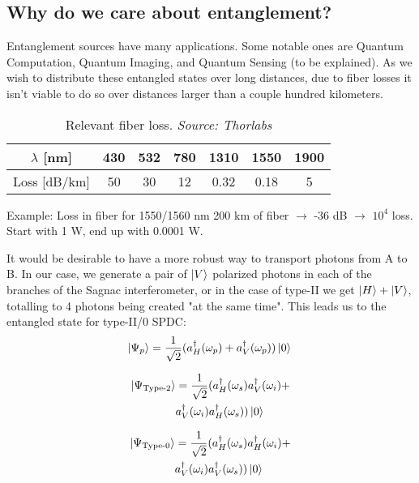 \documentclass{article}
\theoremstyle{mytheoremstyle}
\theoremstyle{mytheoremstyle}
\theoremstyle{myproblemstyle}
\begin{document}
\subsection{Why do we care about entanglement?}
Entanglement sources have many applications. Some notable ones are Quantum Computation, Quantum Imaging,
and Quantum Sensing (to be explained). %
As we wish to distribute these entangled states over long distances, due to fiber losses it isn't viable to do so
over distances larger than a couple hundred kilometers.
\begin{center}
	\begin{table}[h]
		\caption{Relevant fiber loss. \textit{Source: Thorlabs}}
		\label{tab:fiberloss}
		\begin{tabular}{|c|c|c|c|c|c|c|}
			\hline
			$\lambda$ [nm] & 430 & 532 & 780 & 1310 & 1550 & 1900\\
			\hline
			Loss [dB/km] & 50 & 30 & 12 & 0.32 &  0.18 & 5\\
			\hline
		\end{tabular}
	\end{table}
\end{center}
\begin{exampleblock}{Example: Loss in fiber for 1550/1560 nm}
	200 km of fiber $\rightarrow$ -36 dB $\rightarrow$ $10^4$ loss.
	Start with 1 W, end up with 0.0001 W.
\end{exampleblock}
It would be desirable to have a more robust way to transport photons from A to B.
In our case, we generate a pair of $\ket{V}$ polarized photons in each of the branches of the Sagnac interferometer,
or in the case of type-II we get $\ket{H} + \ket{V}$, totalling to 4 photons being created "at the same time".
This leads us to the entangled state for type-II/0 SPDC:
\begin{equation*}
	\ket{\Psi_{p}} = \frac{1}{\sqrt{2}} ( a_{H}^{\dagger} ( \omega_p ) + a_{V}^{\dagger} ( \omega_p ) )\ket{0}\\
\end{equation*}
\begin{minipage}[l]{0.48\textwidth}
	\begin{equation*}
		\begin{aligned}
			\ket{\Psi_{\text{Type-2}}} &= \frac{1}{\sqrt{2}}(a_{H}^{\dagger}(\omega_s)a_{V}^{\dagger}(\omega_i)+\\
								&a_{V}^{\dagger}(\omega_i)a_{H}^{\dagger}(\omega_s))\ket{0}\\
		\end{aligned}
	\end{equation*}
\end{minipage}
\begin{minipage}[r]{0.48\textwidth}
\begin{equation*}
	\begin{aligned}
		\ket{\Psi_{\text{Type-0}}} &= \frac{1}{\sqrt{2}}(a_{H}^{\dagger}(\omega_s)a_{H}^{\dagger}(\omega_i)+\\
								   &a_{V}^{\dagger}(\omega_i)a_{V}^{\dagger}(\omega_s))\ket{0}
	\end{aligned}
\end{equation*}
\end{minipage}
\end{document}
